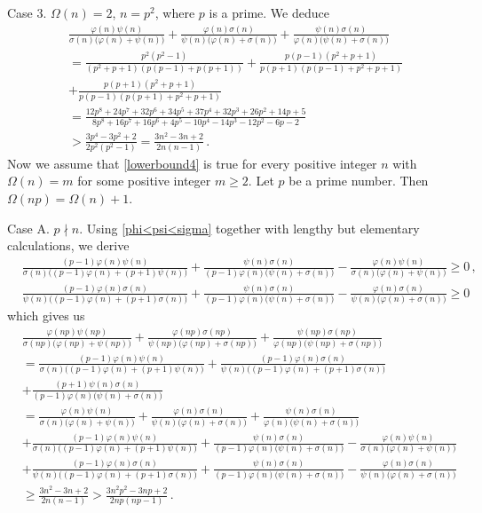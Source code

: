 \documentclass[12pt]{article}
\begin{document}
Case 3. \; $\Omega(n)=2$, $n=p^2$, where $p$ is a prime. We deduce
\begin{align*}
&\frac{\varphi(n)\psi(n)}{\sigma(n)\big(\varphi(n)+\psi(n)\big)}+\frac{\varphi(n)\sigma(n)}{\psi(n)\big(\varphi(n)+\sigma(n)\big)}+\frac{\psi(n)\sigma(n)}{\varphi(n)\big(\psi(n)+\sigma(n)\big)}\\
&=\frac{p^2(p^2-1)}{(p^2+p+1)(p(p-1)+p(p+1))}+\frac{p(p-1)(p^2+p+1)}{p(p+1)(p(p-1)+p^2+p+1)} \\
&+\frac{p(p+1)(p^2+p+1)}{p(p-1)(p(p+1)+p^2+p+1)}\\
&=\frac{12p^8+24p^7+32p^6+34p^5+37p^4+32p^3+26p^2+14p+5}{8p^8+16p^7+16p^6+4p^5-10p^4-14p^3-12p^2-6p-2}\\
&>\frac{3p^4-3p^2+2}{2p^2(p^2-1)}=\frac{3n^2-3n+2}{2n(n-1)}\,.
\end{align*}
Now we assume that \eqref{lowerbound4} is true for every positive integer $n$ with $\Omega(n)=m$ for some positive integer $m\geq2$.
Let $p$ be a prime number. Then $\Omega(np)=\Omega(n)+1$.

Case A.  \;  $p\nmid n$. Using \eqref{phi<psi<sigma} together with lengthy but elementary calculations, we derive 
\begin{align*}
&\frac{(p-1)\varphi(n)\psi(n)}{\sigma(n)\big((p-1)\varphi(n)+(p+1)\psi(n)\big)}+\frac{\psi(n)\sigma(n)}{(p-1)\varphi(n)\big(\psi(n)+\sigma(n)\big)}
-\frac{\varphi(n)\psi(n)}{\sigma(n)\big(\varphi(n)+\psi(n)\big)}\geq0\,,\\
&\frac{(p-1)\varphi(n)\sigma(n)}{\psi(n)\big((p-1)\varphi(n)+(p+1)\sigma(n)\big)}+\frac{\psi(n)\sigma(n)}{(p-1)\varphi(n)\big(\psi(n)+\sigma(n)\big)}
-\frac{\varphi(n)\sigma(n)}{\psi(n)\big(\varphi(n)+\sigma(n)\big)}\geq0
\end{align*}
which gives us
\begin{align*}
&\frac{\varphi(np)\psi(np)}{\sigma(np)\big(\varphi(np)+\psi(np)\big)}+\frac{\varphi(np)\sigma(np)}{\psi(np)\big(\varphi(np)+\sigma(np)\big)}+\frac{\psi(np)\sigma(np)}{\varphi(np)\big(\psi(np)+\sigma(np)\big)}\\
&=\frac{(p-1)\varphi(n)\psi(n)}{\sigma(n)\big((p-1)\varphi(n)+(p+1)\psi(n)\big)}+\frac{(p-1)\varphi(n)\sigma(n)}{\psi(n)\big((p-1)\varphi(n)+(p+1)\sigma(n)\big)}\\
&+\frac{(p+1)\psi(n)\sigma(n)}{(p-1)\varphi(n)\big(\psi(n)+\sigma(n)\big)}\\
&=\frac{\varphi(n)\psi(n)}{\sigma(n)\big(\varphi(n)+\psi(n)\big)}+\frac{\varphi(n)\sigma(n)}{\psi(n)\big(\varphi(n)+\sigma(n)\big)}+\frac{\psi(n)\sigma(n)}{\varphi(n)\big(\psi(n)+\sigma(n)\big)}\\
&+\frac{(p-1)\varphi(n)\psi(n)}{\sigma(n)\big((p-1)\varphi(n)+(p+1)\psi(n)\big)}+\frac{\psi(n)\sigma(n)}{(p-1)\varphi(n)\big(\psi(n)+\sigma(n)\big)}
-\frac{\varphi(n)\psi(n)}{\sigma(n)\big(\varphi(n)+\psi(n)\big)}\\
&+\frac{(p-1)\varphi(n)\sigma(n)}{\psi(n)\big((p-1)\varphi(n)+(p+1)\sigma(n)\big)}+\frac{\psi(n)\sigma(n)}{(p-1)\varphi(n)\big(\psi(n)+\sigma(n)\big)}
-\frac{\varphi(n)\sigma(n)}{\psi(n)\big(\varphi(n)+\sigma(n)\big)}\\
&\geq\frac{3n^2-3n+2}{2n(n-1)}>\frac{3n^2p^2-3np+2}{2np(np-1)}\,.
\end{align*}
\end{document}
